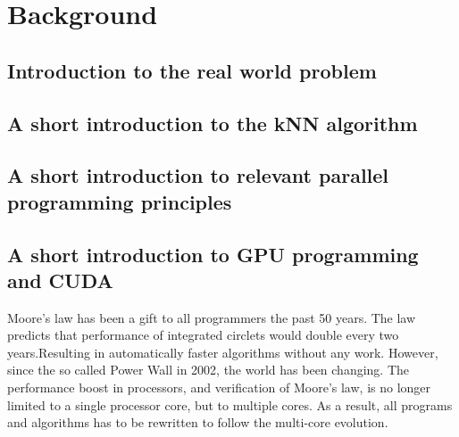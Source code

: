 \section{Background}

\subsection{Introduction to the real world problem} %
\label{sub:introduction_to_the_real_world_problem}


\subsection{A short introduction to the kNN algorithm} %
\label{a_short_introduction_to_the_kNN_algorithm}


\subsection{A short introduction to relevant parallel programming principles} %
\label{sub:a_short_introduction_to_relevant_parallel_programming_principles}


\subsection{A short introduction to GPU programming and CUDA} %
\label{sub:a_short_introduction_to_gpu_programming_and_cuda}

Moore's law has been a gift to all programmers the past 50 years. The law predicts that performance of integrated circlets would double every two years.Resulting in automatically faster algorithms without any work. However, since the so called Power Wall in 2002, the world has been changing. The performance boost  in processors, and verification of Moore's law, is no longer limited to a single processor core, but to multiple cores. As a result, all programs and algorithms has to be rewritten to follow the multi-core evolution.


